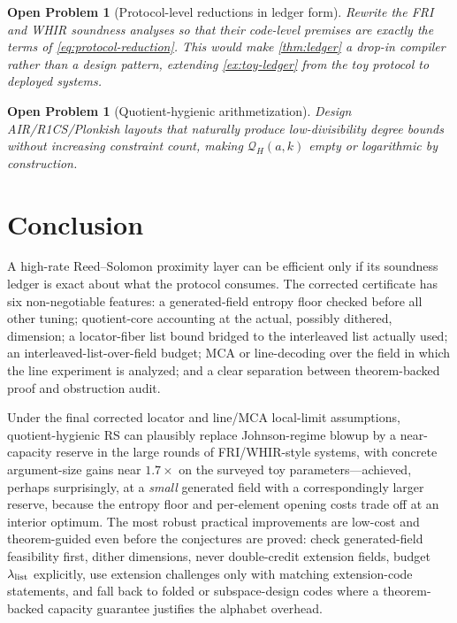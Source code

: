 \documentclass[11pt]{article}
\newtheorem{openproblem}[theorem]{Open Problem}
\theoremstyle{definition}
\newcommand{\Qprof}{\mathcal Q}
\begin{document}
\begin{openproblem}[Protocol-level reductions in ledger form]
\label{op:protocol-rewrite}
Rewrite the FRI and WHIR soundness analyses so that their code-level premises are exactly the terms of \eqref{eq:protocol-reduction}.  This would make \cref{thm:ledger} a drop-in compiler rather than a design pattern, extending \cref{ex:toy-ledger} from the toy protocol to deployed systems.
\end{openproblem}

\begin{openproblem}[Quotient-hygienic arithmetization]
\label{op:arithmetization}
Design AIR/R1CS/Plonkish layouts that naturally produce low-divisibility degree bounds without increasing constraint count, making $\Qprof_H(a,k)$ empty or logarithmic by construction.
\end{openproblem}

\section{Conclusion}
\label{sec:conclusion}

A high-rate Reed--Solomon proximity layer can be efficient only if its soundness ledger is exact about what the protocol consumes.  The corrected certificate has six non-negotiable features: a generated-field entropy floor checked before all other tuning; quotient-core accounting at the actual, possibly dithered, dimension; a locator-fiber list bound bridged to the interleaved list actually used; an interleaved-list-over-field budget; MCA or line-decoding over the field in which the line experiment is analyzed; and a clear separation between theorem-backed proof and obstruction audit.

Under the final corrected locator and line/MCA local-limit assumptions, quotient-hygienic RS can plausibly replace Johnson-regime blowup by a near-capacity reserve in the large rounds of FRI/WHIR-style systems, with concrete argument-size gains near $1.7\times$ on the surveyed toy parameters---achieved, perhaps surprisingly, at a \emph{small} generated field with a correspondingly larger reserve, because the entropy floor and per-element opening costs trade off at an interior optimum.  The most robust practical improvements are low-cost and theorem-guided even before the conjectures are proved: check generated-field feasibility first, dither dimensions, never double-credit extension fields, budget $\lambda_{\rm list}$ explicitly, use extension challenges only with matching extension-code statements, and fall back to folded or subspace-design codes where a theorem-backed capacity guarantee justifies the alphabet overhead.
\end{document}
